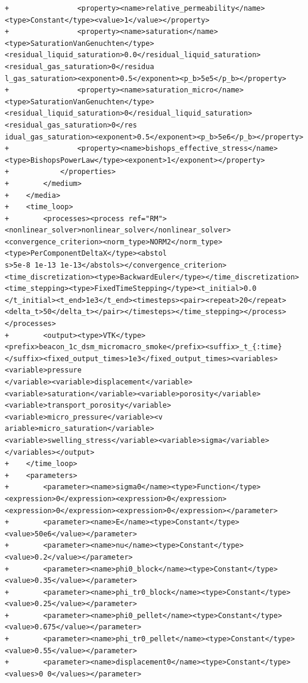 \documentclass[10pt]{article}
\begin{document}
\begin{lstlisting}
+                <property><name>relative_permeability</name><type>Constant</type><value>1</value></property>
+                <property><name>saturation</name><type>SaturationVanGenuchten</type><residual_liquid_saturation>0.0</residual_liquid_saturation><residual_gas_saturation>0</residua
l_gas_saturation><exponent>0.5</exponent><p_b>5e5</p_b></property>
+                <property><name>saturation_micro</name><type>SaturationVanGenuchten</type><residual_liquid_saturation>0</residual_liquid_saturation><residual_gas_saturation>0</res
idual_gas_saturation><exponent>0.5</exponent><p_b>5e6</p_b></property>
+                <property><name>bishops_effective_stress</name><type>BishopsPowerLaw</type><exponent>1</exponent></property>
+            </properties>
+        </medium>
+    </media>
+    <time_loop>
+        <processes><process ref="RM"><nonlinear_solver>nonlinear_solver</nonlinear_solver><convergence_criterion><norm_type>NORM2</norm_type><type>PerComponentDeltaX</type><abstol
s>5e-8 1e-13 1e-13</abstols></convergence_criterion><time_discretization><type>BackwardEuler</type></time_discretization><time_stepping><type>FixedTimeStepping</type><t_initial>0.0
</t_initial><t_end>1e3</t_end><timesteps><pair><repeat>20</repeat><delta_t>50</delta_t></pair></timesteps></time_stepping></process></processes>
+        <output><type>VTK</type><prefix>beacon_1c_dsm_micromacro_smoke</prefix><suffix>_t_{:time}</suffix><fixed_output_times>1e3</fixed_output_times><variables><variable>pressure
</variable><variable>displacement</variable><variable>saturation</variable><variable>porosity</variable><variable>transport_porosity</variable><variable>micro_pressure</variable><v
ariable>micro_saturation</variable><variable>swelling_stress</variable><variable>sigma</variable></variables></output>
+    </time_loop>
+    <parameters>
+        <parameter><name>sigma0</name><type>Function</type><expression>0</expression><expression>0</expression><expression>0</expression><expression>0</expression></parameter>
+        <parameter><name>E</name><type>Constant</type><value>50e6</value></parameter>
+        <parameter><name>nu</name><type>Constant</type><value>0.2</value></parameter>
+        <parameter><name>phi0_block</name><type>Constant</type><value>0.35</value></parameter>
+        <parameter><name>phi_tr0_block</name><type>Constant</type><value>0.25</value></parameter>
+        <parameter><name>phi0_pellet</name><type>Constant</type><value>0.675</value></parameter>
+        <parameter><name>phi_tr0_pellet</name><type>Constant</type><value>0.55</value></parameter>
+        <parameter><name>displacement0</name><type>Constant</type><values>0 0</values></parameter>

\end{lstlisting}
\end{document}
